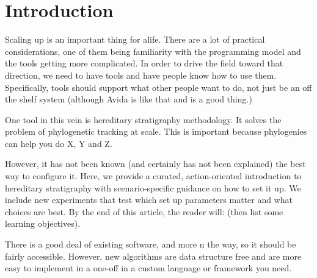 \section{Introduction} \label{sec:introduction}

Scaling up is an important thing for alife.
There are a lot of practical considerations, one of them being familiarity with the programming model and the tools getting more complicated.
In order to drive the field toward that direction, we need to have tools and have people know how to use them.
Specifically, tools should support what other people want to do, not just be an off the shelf system (although Avida is like that and is a good thing.)

One tool in this vein is hereditary stratigraphy methodology.
It solves the problem of phylogenetic tracking at scale.
This is important because phylogenies can help you do X, Y and Z.

However, it has not been known (and certainly has not been explained) the best way to configure it.
Here, we provide a curated, action-oriented introduction to hereditary stratigraphy with scenario-specific guidance on how to set it up.
We include new experiments that test which set up parameters matter and what choices are best.
By the end of this article, the reader will: (then list some learning objectives).

There is a good deal of existing software, and more n the way, so it should be fairly accessible.
However, new algorithms are data structure free and are more easy to implement in a one-off in a custom language or framework you need.
